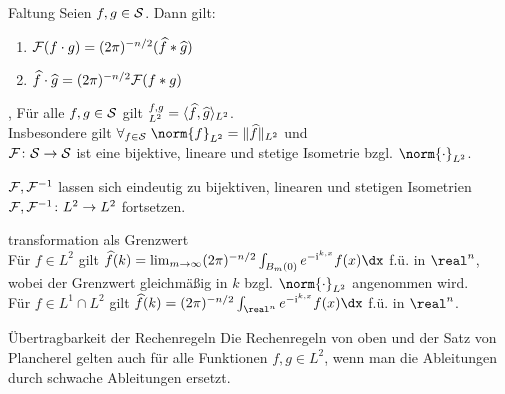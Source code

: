 \begin{Satz}{Faltung}
    Seien $f, g \in \S$.
    Dann gilt:
    \begin{enumerate}
        \item
        $\F(f \cdot g) = (2\pi)^{-n/2} (\widehat{f} \ast \widehat{g})$
        
        \item
        $\widehat{f} \cdot \widehat{g} = (2\pi)^{-n/2} \F(f \ast g)$
    \end{enumerate}
\end{Satz}

\linie

\begin{Satz}{, }
    Für alle $f, g \in \S$ gilt $\sp{f, g}_{L^2} =
    \langle\widehat{f}, \widehat{g}\rangle_{L^2}$.\\
    Insbesondere gilt $\forall_{f \in \S}\; \norm{f}_{L^2} = \Vert\widehat{f}\Vert_{L^2}$ und\\
    $\F\colon \S \rightarrow \S$ ist eine bijektive, lineare und stetige Isometrie
    bzgl. $\norm{\cdot}_{L^2}$.
\end{Satz}

\begin{Kor}
    $\F, \F^{-1}$ lassen sich eindeutig zu bijektiven, linearen und stetigen Isometrien\\
    $\F, \F^{-1}\colon L^2 \rightarrow L^2$ fortsetzen.
\end{Kor}

\linie
\pagebreak

\begin{Satz}{transformation als Grenzwert}\\
    Für $f \in L^2$ gilt
    $\widehat{f}(k) = \lim_{m \to \infty} (2\pi)^{-n/2} \int_{B_m(0)} e^{-\iu\sp{k,x}}f(x)\dx$
    f.ü. in $\real^n$, wobei der Grenzwert gleichmäßig in $k$ bzgl. $\norm{\cdot}_{L^2}$
    angenommen wird.\\
    Für $f \in L^1 \cap L^2$ gilt
    $\widehat{f}(k) = (2\pi)^{-n/2} \int_{\real^n} e^{-\iu\sp{k,x}}f(x)\dx$ f.ü. in $\real^n$.
\end{Satz}

\begin{Satz}{Übertragbarkeit der Rechenregeln}
    Die Rechenregeln von oben und der Satz von Plancherel gelten auch für alle Funktionen
    $f, g \in L^2$, wenn man die Ableitungen durch schwache Ableitungen ersetzt.
\end{Satz}

